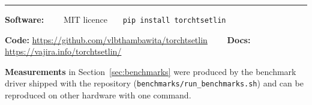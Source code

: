 \begin{titlepage}
\vfill

{\sffamily\scriptsize\color{ttgray}
 \setlength{\parskip}{0.15em}
 \textcolor{ttorange}{\rule[0.25em]{2.2em}{1.6pt}}\par
 \textbf{Software:} \ttlibname \ttversion\ \ \textbar\ \ MIT licence \ \textbar\ \
 \texttt{pip install torchtsetlin}\par
 \textbf{Code:} \url{https://github.com/vlbthambawita/torchtsetlin} \ \ \textbar\ \
 \textbf{Docs:} \url{https://vajira.info/torchtsetlin/}\par
 \textbf{Measurements} in Section~\ref{sec:benchmarks} were produced by the benchmark driver
 shipped with the repository (\texttt{benchmarks/run\_benchmarks.sh}) and can be reproduced on
 other hardware with one command.\par
}
\end{titlepage}
